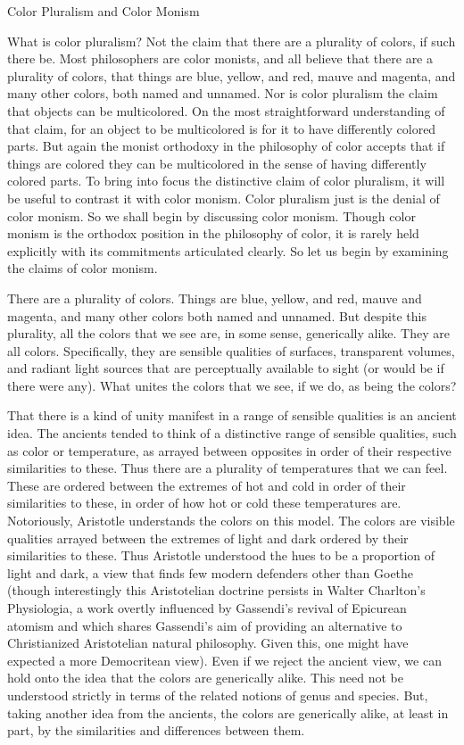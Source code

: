 Color Pluralism and Color Monism

What is color pluralism? Not the claim that there are a plurality of colors, if such there be. Most philosophers are color monists, and all believe that there are a plurality of colors, that things are blue, yellow, and red, mauve and magenta, and many other colors, both named and unnamed. Nor is color pluralism the claim that objects can be multicolored. On the most straightforward understanding of that claim, for an object to be multicolored is for it to have differently colored parts. But again the monist orthodoxy in the philosophy of color accepts that if things are colored they can be multicolored in the sense of having differently colored parts. To bring into focus the distinctive claim of color pluralism, it will be useful to contrast it with color monism. Color pluralism just is the denial of color monism. So we shall begin by discussing color monism. Though color monism is the orthodox position in the philosophy of color, it is rarely held explicitly with its commitments articulated clearly. So let us begin by examining the claims of color monism.

There are a plurality of colors. Things are blue, yellow, and red, mauve and magenta, and many other colors both named and unnamed. But despite this plurality, all the colors that we see are, in some sense, generically alike. They are all colors. Specifically, they are sensible qualities of surfaces, transparent volumes, and radiant light sources that are perceptually available to sight (or would be if there were any). What unites the colors that we see, if we do, as being the colors?

That there is a kind of unity manifest in a range of sensible qualities is an ancient idea. The ancients tended to think of a distinctive range of sensible qualities, such as color or temperature, as arrayed between opposites in order of their respective similarities to these. Thus there are a plurality of temperatures that we can feel. These are ordered between the extremes of hot and cold in order of their similarities to these, in order of how hot or cold these temperatures are. Notoriously, Aristotle understands the colors on this model. The colors are visible qualities arrayed between the extremes of light and dark ordered by their similarities to these. Thus Aristotle understood the hues to be a proportion of light and dark, a view that finds few modern defenders other than Goethe (though interestingly this Aristotelian doctrine persists in Walter Charlton's Physiologia, a work overtly influenced by Gassendi's revival of Epicurean atomism and which shares Gassendi's aim of providing an alternative to Christianized Aristotelian natural philosophy. Given this, one might have expected a more Democritean view). Even if we reject the ancient view, we can hold onto the idea that the colors are generically alike. This need not be understood strictly in terms of the related notions of genus and species. But, taking another idea from the ancients, the colors are generically alike, at least in part, by the similarities and differences between them.

